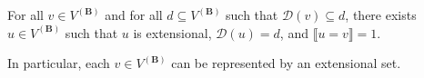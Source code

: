 For all $v \in V^{(\mathbf{B})}$ and for all $d \subseteq V^{(\mathbf{B})}$ such that $\mathcal{D}(v) \subseteq d$, there exists $u \in V^{(\mathbf{B})}$ such that $u$ is extensional, $\mathcal{D}(u) = d$, and $\llbracket u = v \rrbracket = 1$.

In particular, each $v \in V^{(\mathbf{B})}$ can be represented by an extensional set.
